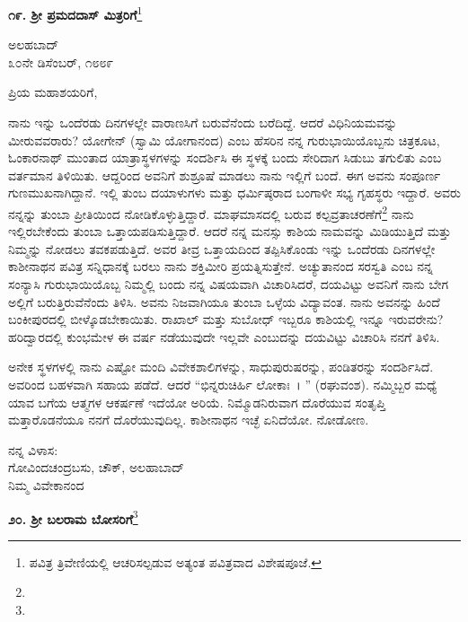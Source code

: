 \begin{center}
\textbf{೧೯. ಶ‍್ರೀ ಪ್ರಮದದಾಸ್ ಮಿತ್ರರಿಗೆ}\footnote{ಪವಿತ್ರ ತ್ರಿವೇಣಿಯಲ್ಲಿ ಆಚರಿಸಲ್ಪಡುವ ಅತ್ಯಂತ ಪವಿತ್ರವಾದ ವಿಶೇಷಪೂಜೆ.}
\end{center}
\vspace{-0.4cm}

\begin{flushright}
ಅಲಹಬಾದ್\\೩೦ನೇ ಡಿಸೆಂಬರ್, ೧೮೮೯
\end{flushright}
\vspace{-0.3cm}

\noindent
ಪ್ರಿಯ ಮಹಾಶಯರಿಗೆ,

ನಾನು ಇನ್ನು ಒಂದೆರಡು ದಿನಗಳಲ್ಲೇ ವಾರಾಣಸಿಗೆ ಬರುವೆನೆಂದು ಬರೆದಿದ್ದೆ. ಆದರೆ ವಿಧಿನಿಯಮವನ್ನು ಮೀರುವವರಾರು? ಯೋಗೇನ್ (ಸ್ವಾಮಿ ಯೋಗಾನಂದ) ಎಂಬ ಹೆಸರಿನ ನನ್ನ ಗುರುಭಾಯಿಯೊಬ್ಬನು ಚಿತ್ರಕೂಟ, ಓಂಕಾರನಾಥ್ ಮುಂತಾದ ಯಾತ್ರಾಸ್ಥಳಗಳನ್ನು ಸಂದರ್ಶಿಸಿ ಈ ಸ್ಥಳಕ್ಕೆ ಬಂದು ಸೇರಿದಾಗ ಸಿಡುಬು ತಗುಲಿತು ಎಂಬ ವರ್ತಮಾನ ತಿಳಿಯಿತು. ಆದ್ದರಿಂದ ಅವನಿಗೆ ಶುಶ್ರೂಷೆ ಮಾಡಲು ನಾನು ಇಲ್ಲಿಗೆ ಬಂದೆ. ಈಗ ಅವನು ಸಂಪೂರ್ಣ ಗುಣಮುಖನಾಗಿದ್ದಾನೆ. ಇಲ್ಲಿ ತುಂಬ ದಯಾಳುಗಳು ಮತ್ತು ಧರ್ಮಿಷ್ಠರಾದ ಬಂಗಾಳೀ ಸಭ್ಯ ಗೃಹಸ್ಥರು ಇದ್ದಾರೆ. ಅವರು ನನ್ನನ್ನು ತುಂಬಾ ಪ್ರೀತಿಯಿಂದ ನೋಡಿಕೊಳ್ಳುತ್ತಿದ್ದಾರೆ. ಮಾಘಮಾಸದಲ್ಲಿ ಬರುವ ಕಲ್ಪವ್ರತಾಚರಣೆಗೆ\footnote{} ನಾನು ಇಲ್ಲಿರಬೇಕೆಂದು ತುಂಬಾ ಒತ್ತಾಯಪಡಿಸುತ್ತಿದ್ದಾರೆ. ಆದರೆ ನನ್ನ ಮನಸ್ಸು ಕಾಶಿಯ ನಾಮವನ್ನು ಮಿಡಿಯುತ್ತಿದೆ ಮತ್ತು ನಿಮ್ಮನ್ನು ನೋಡಲು ತವಕಪಡುತ್ತಿದೆ. ಅವರ ತೀವ್ರ ಒತ್ತಾಯದಿಂದ ತಪ್ಪಿಸಿಕೊಂಡು ಇನ್ನು ಒಂದೆರಡು ದಿನಗಳಲ್ಲೇ ಕಾಶೀನಾಥನ ಪವಿತ್ರ ಸನ್ನಿಧಾನಕ್ಕೆ ಬರಲು ನಾನು ಶಕ್ತಿಮೀರಿ ಪ್ರಯತ್ನಿಸುತ್ತೇನೆ. ಅಚ್ಯುತಾನಂದ ಸರಸ್ವತಿ ಎಂಬ ನನ್ನ ಸಂನ್ಯಾಸಿ ಗುರುಭಾಯಿಯೊಬ್ಬ ನಿಮ್ಮಲ್ಲಿ ಬಂದು ನನ್ನ ವಿಷಯವಾಗಿ ವಿಚಾರಿಸಿದರೆ, ದಯವಿಟ್ಟು ಅವನಿಗೆ ನಾನು ಬೇಗ ಅಲ್ಲಿಗೆ ಬರುತ್ತಿರುವೆನೆಂದು ತಿಳಿಸಿ. ಅವನು ನಿಜವಾಗಿಯೂ ತುಂಬಾ ಒಳ್ಳೆಯ ವಿದ್ಯಾವಂತ. ನಾನು ಅವನನ್ನು ಹಿಂದೆ ಬಂಕೀಪುರದಲ್ಲಿ ಬೀಳ್ಕೊಡಬೇಕಾಯಿತು. ರಾಖಾಲ್ ಮತ್ತು ಸುಬೋಧ್ ಇಬ್ಬರೂ ಕಾಶಿಯಲ್ಲಿ ಇನ್ನೂ ಇರುವರೇನು?ಹರಿದ್ವಾರದಲ್ಲಿ ಕುಂಭಮೇಳ ಈ ವರ್ಷ ನಡೆಯುವುದೇ ಇಲ್ಲವೇ ಎಂಬುದನ್ನು ದಯವಿಟ್ಟು ವಿಚಾರಿಸಿ ನನಗೆ ತಿಳಿಸಿ.

ಅನೇಕ ಸ್ಥಳಗಳಲ್ಲಿ ನಾನು ಎಷ್ಟೋ ಮಂದಿ ವಿವೇಕಶಾಲಿಗಳನ್ನು, ಸಾಧುಪುರುಷರನ್ನು, ಪಂಡಿತರನ್ನು ಸಂದರ್ಶಿಸಿದೆ. ಅವರಿಂದ ಬಹಳವಾಗಿ ಸಹಾಯ ಪಡೆದೆ. ಆದರೆ “ಭಿನ್ನರುಚಿರ್ಹಿ ಲೋಕಾಃ~। ” (ರಘುವಂಶ). ನಮ್ಮಿಬ್ಬರ ಮಧ್ಯೆ ಯಾವ ಬಗೆಯ ಆತ್ಮಗಳ ಆಕರ್ಷಣೆ ಇದೆಯೋ ಅರಿಯೆ. ನಿಮ್ಮೊಡನಿರುವಾಗ ದೊರೆಯುವ ಸಂತೃಪ್ತಿ ಮತ್ತಾರೊಡನೆಯೂ ನನಗೆ ದೊರೆಯುವುದಿಲ್ಲ. ಕಾಶೀನಾಥನ ಇಚ್ಛೆ ಏನಿದೆಯೋ. ನೋಡೋಣ.

\vspace{-0.3cm}

{\flushright
ನನ್ನ ವಿಳಾಸ:\\ ಗೋವಿಂದಚಂದ್ರಬಸು, ಚೌಕ್, ಅಲಹಾಬಾದ್\\ನಿಮ್ಮ ವಿವೇಕಾನಂದ\par}

\begin{center}
\textbf{೨೦. ಶ‍್ರೀ ಬಲರಾಮ ಬೋಸರಿಗೆ}\footnote{}
\end{center}


